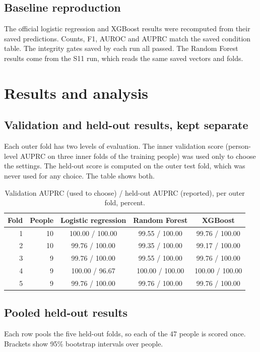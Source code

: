 \documentclass[11pt,a4paper]{article}
\begin{document}
\subsection{Baseline reproduction}\label{sec:reproduction}
The official logistic regression and XGBoost results were recomputed from their saved predictions. Counts, F1, AUROC and AUPRC match the saved condition table. The integrity gates saved by each run all passed. The Random Forest results come from the S11 run, which reads the same saved vectors and folds.

\section{Results and analysis}\label{sec:results}
\subsection{Validation and held-out results, kept separate}\label{sec:trainval}
Each outer fold has two levels of evaluation. The inner validation score (person-level AUPRC on three inner folds of the training people) was used only to choose the settings. The held-out score is computed on the outer test fold, which was never used for any choice. The table shows both.

\begin{table}[H]\centering\footnotesize\renewcommand{\arraystretch}{1.15}
\caption{Validation AUPRC (used to choose) / held-out AUPRC (reported), per outer fold, percent.}
\begin{tabular}{rrccc}
\toprule
\textbf{Fold} & \textbf{People} & \textbf{Logistic regression} & \textbf{Random Forest} & \textbf{XGBoost}\\
\midrule
1 & 10 & 100.00 / 100.00 & 99.55 / 100.00 & 99.76 / 100.00\\
2 & 10 & 99.76 / 100.00 & 99.35 / 100.00 & 99.17 / 100.00\\
3 & 9 & 99.76 / 100.00 & 99.55 / 100.00 & 99.76 / 100.00\\
4 & 9 & 100.00 / 96.67 & 100.00 / 100.00 & 100.00 / 100.00\\
5 & 9 & 99.76 / 100.00 & 99.76 / 100.00 & 99.76 / 100.00\\
\bottomrule
\end{tabular}\end{table}
\subsection{Pooled held-out results}\label{sec:pooled}
Each row pools the five held-out folds, so each of the 47 people is scored once. Brackets show 95\% bootstrap intervals over people.
\end{document}
